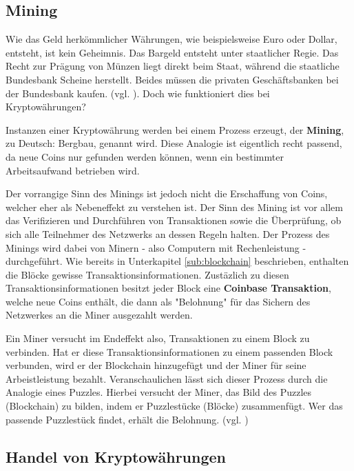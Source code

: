 \documentclass[oneside]{ausarbeitung}
\begin{document}
\subsection{Mining}
\label{sub:mining}

Wie das Geld herkömmlicher Währungen, wie beispielsweise Euro oder
Dollar, entsteht, ist kein Geheimnis. Das Bargeld entsteht unter
staatlicher Regie. Das Recht zur Prägung von Münzen liegt direkt
beim Staat, während die staatliche Bundesbank Scheine herstellt.
Beides müssen die privaten Geschäftsbanken bei der Bundesbank
kaufen. (vgl. \cite{herstellung_fiat_waehrung}). Doch wie funktioniert
dies bei Kryptowährungen?  

Instanzen einer Kryptowährung werden bei einem Prozess erzeugt, der
\textbf{Mining}, zu Deutsch: Bergbau, genannt wird. Diese Analogie ist
eigentlich recht passend, da neue Coins nur gefunden werden können,
wenn ein bestimmter Arbeitsaufwand betrieben wird.

Der vorrangige Sinn des Minings ist jedoch nicht die Erschaffung von
Coins, welcher eher als Nebeneffekt zu verstehen ist. Der Sinn des
Mining ist vor allem das Verifizieren und Durchführen von
Transaktionen sowie die Überprüfung, ob sich alle Teilnehmer des
Netzwerks an dessen Regeln halten. Der Prozess des Minings wird dabei
von Minern - also Computern mit Rechenleistung - durchgeführt. Wie
bereits in Unterkapitel \ref{sub:blockchain} beschrieben, enthalten
die Blöcke gewisse Transaktionsinformationen. Zustäzlich zu diesen
Transaktionsinformationen besitzt jeder Block eine \textbf{Coinbase
Transaktion}, welche neue Coins enthält, die dann als "Belohnung"
für das Sichern des Netzwerkes an die Miner ausgezahlt werden.  

Ein Miner versucht im Endeffekt also, Transaktionen zu einem Block zu
verbinden. Hat er diese Transaktionsinformationen zu einem passenden
Block verbunden, wird er der Blockchain hinzugefügt und der Miner
für seine Arbeistleistung bezahlt. Veranschaulichen lässt sich
dieser Prozess durch die Analogie eines Puzzles.  Hierbei versucht der
Miner, das Bild des Puzzles (Blockchain) zu bilden, indem er
Puzzlestücke (Blöcke) zusammenfügt. Wer das passende Puzzlestück
findet, erhält die Belohnung. (vgl. \cite{mining})


\subsection{Handel von Kryptowährungen}
\label{sub:handel_von_kryptowährungen}
\end{document}
